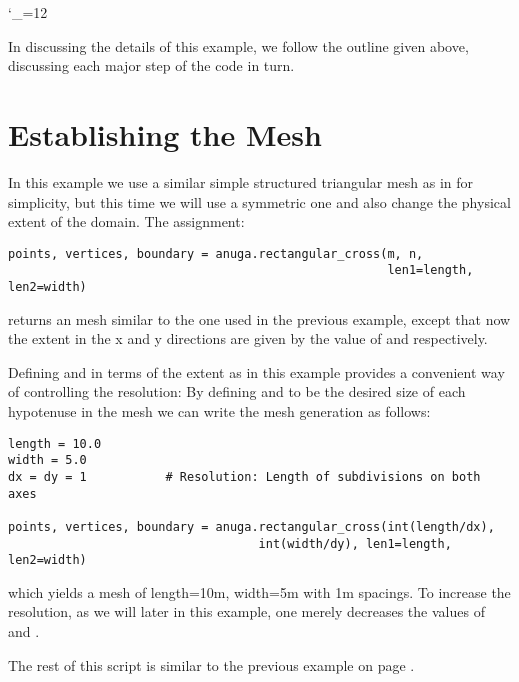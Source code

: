 \documentclass{manual}
\newcommand{\verbatiminputB}[1]{%
\endgroup}
\def\verbatiminputunderscore{\begingroup
\catcode`\_=12
\verbatiminputB}
\begin{document}
\verbatiminputunderscore{../../anuga_core/examples/channel1.py}

In discussing the details of this example, we follow the outline
given above, discussing each major step of the code in turn.

\section{Establishing the Mesh}

In this example we use a similar simple structured triangular mesh
as in 
for simplicity, but this time we will use a symmetric one and also
change the physical extent of the domain. The assignment:

\begin{verbatim}
points, vertices, boundary = anuga.rectangular_cross(m, n,
                                                     len1=length, len2=width)
\end{verbatim}

returns an  mesh similar to the one used in the previous example, except that now the
extent in the x and y directions are given by the value of  and 
respectively.

Defining  and  in terms of the extent as in this example provides a convenient way of
controlling the resolution: By defining  and  to be the desired size of each
hypotenuse in the mesh we can write the mesh generation as follows:

\begin{verbatim}
length = 10.0
width = 5.0
dx = dy = 1           # Resolution: Length of subdivisions on both axes

points, vertices, boundary = anuga.rectangular_cross(int(length/dx),
                                   int(width/dy), len1=length, len2=width)
\end{verbatim}

which yields a mesh of length=10m, width=5m with 1m spacings. To increase the resolution,
as we will later in this example, one merely decreases the values of  and .

The rest of this script is similar to the previous example on page \pageref{ref:runup_py_code}.
\end{document}
